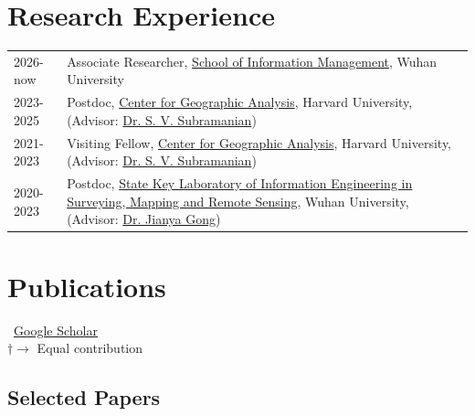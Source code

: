 \documentclass[11pt]{article}
\begin{document}
\section*{Research Experience}
\label{exp_research}

\begin{longtable}[l]{@{}p{} p{}}

	2026-now  & Associate Researcher, \href{https://sim.whu.edu.cn/English/Home.htm}{School of Information Management}, Wuhan University                                                                                                                 \\

	2023-2025 & Postdoc, \href{https://gis.harvard.edu/}{Center for Geographic Analysis}, Harvard University, (Advisor: \href{https://gis.harvard.edu/people/s-v-subramanian}{Dr. S. V. Subramanian})                                                    \\

	2021-2023 & Visiting Fellow, \href{https://gis.harvard.edu/}{Center for Geographic Analysis}, Harvard University, (Advisor: \href{https://gis.harvard.edu/people/s-v-subramanian}{Dr. S. V. Subramanian})                                            \\

	2020-2023 & Postdoc, \href{http://www.lmars.whu.edu.cn/en/}{State Key Laboratory of Information Engineering in Surveying, Mapping and Remote Sensing}, Wuhan University, (Advisor: \href{https://en.whu.edu.cn/info/1073/1568.htm}{Dr. Jianya Gong}) \\
\end{longtable}

\section*{Publications}
\label{pubs}

\vspace{-.75em}
\small
{}~\href{https://scholar.google.com.hk/citations?user=H9RAbHIAAAAJ}{Google Scholar}\\
$\dagger \rightarrow$ Equal contribution
\normalsize

\subsection*{Selected Papers}
\label{select-paper}
\newrefcontext[labelprefix=S]
\nocite{*}
\printbibliography[type=article, heading=none, resetnumbers=true, keyword=S]
\end{document}
